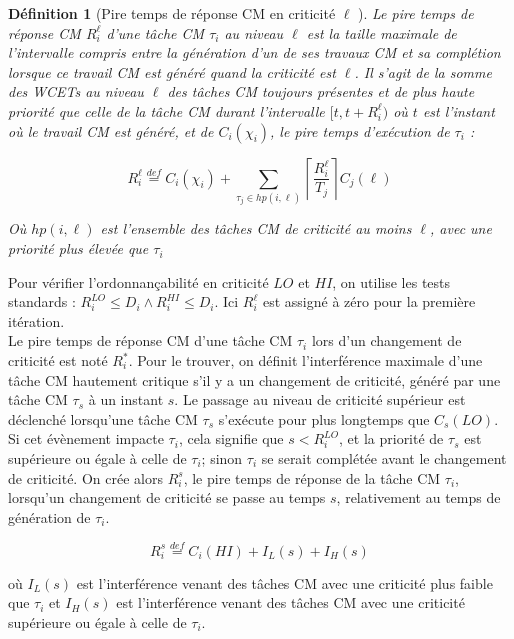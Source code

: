 \documentclass[12pt,a4paper,oneside]{book}
\theoremstyle{break}
\newtheorem{defin}{Définition}[chapter]
\theoremstyle{breakplain}
\begin{document}
\begin{defin}[Pire temps de réponse CM en criticité $\ell$ \cite{baruah2011response}]
Le pire temps de réponse CM $R_i^\ell$ d'une tâche CM $\tau_i$ au niveau $\ell$ est la taille maximale de l'intervalle compris entre la génération d'un de ses travaux CM et sa complétion lorsque ce travail CM est généré quand la criticité est $\ell$. Il s'agit de la somme des WCETs au niveau $\ell$ des tâches CM toujours présentes et de plus haute priorité que celle de la tâche CM durant l'intervalle $[t, t+R_i^\ell)$ où $t$ est l'instant où le travail CM est généré, et de $C_i(\chi_i)$, le pire temps d'exécution de $\tau_i$ :

\begin{equation}
R_i^\ell \overset{def}{=} C_i(\chi_i) +\underset{\tau_j \in hp(i, \ell)}{\sum} \left\lceil\dfrac{R_i^\ell}{T_j}\right\rceil C_j(\ell)
\end{equation}

Où $hp(i, \ell)$ est l'ensemble des tâches CM de criticité au moins $\ell$, avec une priorité plus élevée que $\tau_i$
\end{defin}

Pour vérifier l'ordonnançabilité en criticité $LO$ et $HI$, on utilise les tests standards : $R_i^{LO} \le D_i \wedge R_i^{HI} \le D_i$. Ici $R_i^\ell$ est assigné à zéro pour la première itération.\\

Le pire temps de réponse CM d'une tâche CM $\tau_i$ lors d'un changement de criticité est noté $R_i^*$. Pour le trouver, on définit l'interférence maximale d'une tâche CM hautement critique s’il y a un changement de criticité, généré par une tâche CM $\tau_s$ à un instant $s$. Le passage au niveau de criticité supérieur est déclenché lorsqu'une tâche CM $\tau_s$ s'exécute pour plus longtemps que $C_s(LO)$. Si cet évènement impacte $\tau_i$, cela signifie que $s < R^{LO}_i$, et la priorité de $\tau_s$ est supérieure ou égale à celle de $\tau_i$; sinon $\tau_i$ se serait complétée avant le changement de criticité. On crée alors $R^s_i$, le pire temps de réponse de la tâche CM $\tau_i$, lorsqu'un changement de criticité se passe au temps $s$, relativement au temps de génération de $\tau_i$.

\begin{equation}
R_i^s \overset{def}{=} C_i(HI) + I_L(s) + I_H(s)
\end{equation}

où $I_L(s)$ est l'interférence venant des tâches CM avec une criticité plus faible que $\tau_i$ et $I_H(s)$ est l'interférence venant des tâches CM avec une criticité supérieure ou égale à celle de $\tau_i$.\\
\end{document}
